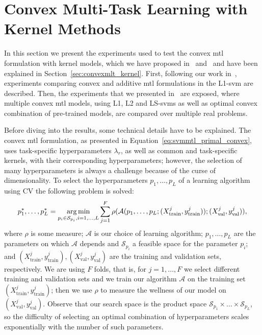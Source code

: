 \section{Convex Multi-Task Learning with Kernel Methods}\label{sec:convexmtlsvm_exp}
In this section we present the experiments used to test the convex \acrshort{mtl} formulation with kernel models, which we have proposed in~\citep{RuizAD19} and~\citep{RuizAD21} and have been explained in Section~\ref{sec:convexmlt_kernel}. 
%
First, following our work in~\citep{RuizAD19}, experiments comparing convex and additive \acrshort{mtl} formulations in the L1-\acrshort{svm} are described. 
%
Then, the experiments that we presented in~\citep{RuizAD21} are exposed, where multiple convex \acrshort{mtl} models, using L1, L2 and LS-\acrshort{svm}s as well as optimal convex combination of pre-trained models, are compared over multiple real problems.

Before diving into the results, some technical details have to be explained. The convex \acrshort{mtl} formulation, as presented in Equation~\eqref{eq:svmmtl_primal_convex}, uses task-specific hyperparameters $\lambda_r$, as well as common and task-specific kernels, with their corresponding hyperparameters; however, the selection of many hyperparameters is always a challenge because of the curse of dimensionality. 
%
To select the hyperparameters $p_1, \ldots, p_L$ of a learning algorithm using CV the following problem is solved:
\begin{equation}
    \label{eq:hp-selection_general}
    p_1^*, \ldots, p_L^* = \argmin_{p_i \in \mathcal{S}_{p_i}, i=1, \ldots, L} \sum_{j=1}^{F} \rho(\mathcal{A}(p_1, \ldots, p_L; (X^j_\text{train}, y^j_\text{train})); (X^j_\text{val}, y^j_\text{val})) ,
\end{equation}
where $\rho$ is some measure; $\mathcal{A}$ is our choice of learning algorithm; $p_1, \ldots, p_L$ are the parameters on which $\mathcal{A}$ depends and $\mathcal{S}_{p_i}$ a feasible space for the parameter $p_i$; and $(X^j_\text{train}, y^j_\text{train}), (X^j_\text{val}, y^j_\text{val})$ are the training and validation sets, respectively. We are using $F$ folds, that is, for $j=1, \ldots, F$ we select different training and validation sets and we train our algorithm $\mathcal{A}$ on the training set $(X^j_\text{train}, y^j_\text{train})$; then we use $\rho$ to measure the wellness of our model on $(X^j_\text{val}, y^j_\text{val})$. 
%
Observe that our search space is the product space $\mathcal{S}_{p_1} \times \ldots \times \mathcal{S}_{p_L}$, so the difficulty of selecting an optimal combination of hyperparameters scales exponentially with the number of such parameters.

